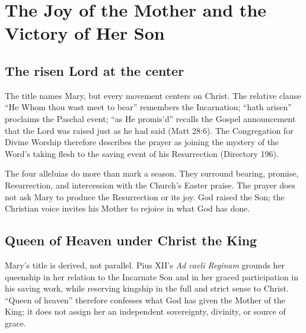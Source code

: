 \section{The Joy of the Mother and the Victory of Her Son}




\subsection{The risen Lord at the center}

The title names Mary, but every movement centers on Christ. The relative clause ``He Whom thou wast meet to bear'' remembers the Incarnation; ``hath arisen'' proclaims the Paschal event; ``as He promis'd'' recalls the Gospel announcement that the Lord was raised just as he had said (Matt 28:6). The Congregation for Divine Worship therefore describes the prayer as joining the mystery of the Word's taking flesh to the saving event of his Resurrection (Directory 196).

The four alleluias do more than mark a season. They surround bearing, promise, Resurrection, and intercession with the Church's Easter praise. The prayer does not ask Mary to produce the Resurrection or its joy. God raised the Son; the Christian voice invites his Mother to rejoice in what God has done.

\subsection{Queen of Heaven under Christ the King}

Mary's title is derived, not parallel. Pius XII's \textit{Ad caeli Reginam} grounds her queenship in her relation to the Incarnate Son and in her graced participation in his saving work, while reserving kingship in the full and strict sense to Christ. ``Queen of heaven'' therefore confesses what God has given the Mother of the King; it does not assign her an independent sovereignty, divinity, or source of grace.

